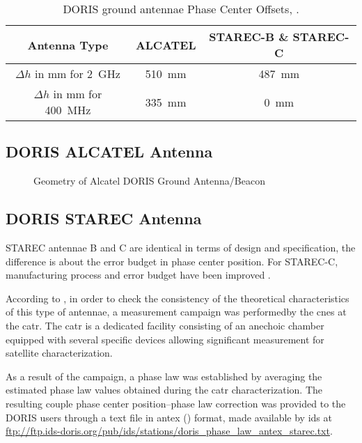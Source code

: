 \begin{table}[h!]
    \centering
    \begin{tabular}{|c|c|c|}
        \hline
        \textbf{Antenna Type} & \textbf{ALCATEL} & \textbf{STAREC-B} \& \textbf{STAREC-C} \\
        \hline
        $\Delta h$ in \si{\mm} for \SI{2}{\GHz} & \SI{510}{\mm} & \SI{487}{\mm}\\
        $\Delta h$ in \si{\mm} for \SI{400}{\MHz} & \SI{335}{\mm} & \SI{0}{\mm}\\
        \hline
    \end{tabular}
    \caption{DORIS ground antennae Phase Center Offsets, \cite{DORISGSM}.}
    \label{table:antenna-pco}
\end{table}

\subsection{DORIS ALCATEL Antenna}

\begin{figure}
\centering

\caption{Geometry of Alcatel DORIS Ground Antenna/Beacon}
\label{fig:alcatel-antenna}
\end{figure}


\subsection{DORIS STAREC Antenna}
STAREC antennae B and C are identical in terms of design and specification, the
difference is about the error budget in phase center position. For STAREC-C,
manufacturing process and error budget have been improved \cite{DORISGSM}.

According to \cite{TOURAIN2016}, in order to check the consistency of the theoretical 
characteristics of this type of antennae, a measurement campaign was performedby 
the \gls{cnes} at the \gls{catr}. The \gls{catr} is a dedicated facility 
consisting of an anechoic chamber equipped with several specific devices 
allowing significant measurement for satellite characterization.

As a result of the campaign, a phase law was established by averaging the 
estimated phase law values obtained during the \gls{catr} characterization. 
The resulting couple phase center position–phase law correction was provided 
to the DORIS users through a text file in \gls{antex} (\cite{ANTEXv14}) format, 
made available by \gls{ids} at 
\url{ftp://ftp.ids-doris.org/pub/ids/stations/doris_phase_law_antex_starec.txt}.

